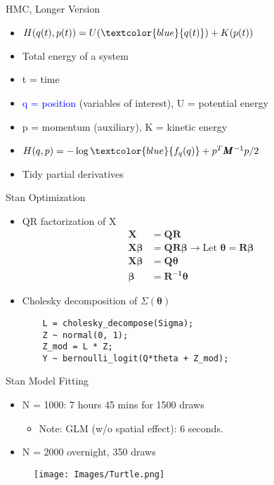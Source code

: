 \documentclass{beamer}
\begin{document}
\begin{frame}{HMC, Longer Version}
  \begin{itemize}
  \addtolength{\itemsep}{0.5\baselineskip}
  \item $H(q(t),p(t)) = U(\textcolor{blue}{q(t)}) + K(p(t))$
  \item Total energy of a system
  \item t = time
  \item \textcolor{blue}{q = position} (variables of interest), U = potential energy
  \item p = momentum (auxiliary), K = kinetic energy
  \item $H(q,p) = -\log \textcolor{blue}{f_{q}(q)} + p^{T}\pmb{M}^{-1}p/2$
  \item Tidy partial derivatives
  \end{itemize}
\end{frame}

\begin{frame}[fragile]{Stan Optimization}
\begin{itemize}
\item QR factorization of X
    \begin{align*}
    \pmb{X} &= \pmb{QR} \\
    \pmb{X \beta} &= \pmb{QR \beta} \rightarrow \text{Let } \pmb{\theta} = \pmb{R \beta} \\
    \pmb{X \beta} &= \pmb{Q \theta} \\
    \pmb{\beta} &= \pmb{R^{-1}\theta}
    \end{align*}
\item Cholesky decomposition of $\Sigma(\pmb{\theta})$
    \begin{verbatim}
    L = cholesky_decompose(Sigma);
    Z ~ normal(0, 1);
    Z_mod = L * Z;
    Y ~ bernoulli_logit(Q*theta + Z_mod);
    \end{verbatim}
\end{itemize}
\end{frame}

\begin{frame}{Stan Model Fitting} %
\begin{itemize}
\addtolength{\itemsep}{0.5\baselineskip}
\item N = 1000: 7 hours 45 mins for 1500 draws
      \begin{itemize}
      \item Note: GLM (w/o spatial effect): 6 seconds.
      \end{itemize}
\item N = 2000 overnight, 350 draws
\end{itemize}
  \begin{figure}[H]
	\centering
	\texttt{[image: Images/Turtle.png]}
	\end{figure}
\end{frame}
\end{document}
